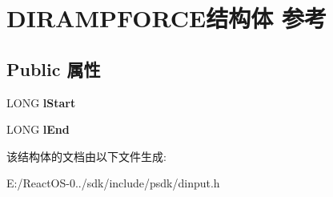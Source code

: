 \hypertarget{struct_d_i_r_a_m_p_f_o_r_c_e}{}\section{D\+I\+R\+A\+M\+P\+F\+O\+R\+C\+E结构体 参考}
\label{struct_d_i_r_a_m_p_f_o_r_c_e}
\subsection*{Public 属性}
\begin{DoxyCompactItemize}
\item 
\mbox{\label{struct_d_i_r_a_m_p_f_o_r_c_e_aecdca7cb0e7ae5dccb6c4de289362491}} 
L\+O\+NG {\bfseries l\+Start}
\item 
\mbox{\label{struct_d_i_r_a_m_p_f_o_r_c_e_aa6012292aacf8cade64400e8d73d61b0}} 
L\+O\+NG {\bfseries l\+End}
\end{DoxyCompactItemize}


该结构体的文档由以下文件生成\+:\begin{DoxyCompactItemize}
\item 
E\+:/\+React\+O\+S-\/0../sdk/include/psdk/dinput.\+h\end{DoxyCompactItemize}
